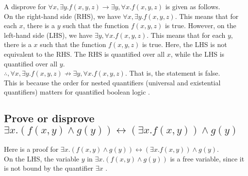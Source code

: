 \documentclass[letter,12pt]{article}
\begin{document}






A disprove for $\forall x, \exists y.f(x, y, z) \rightarrow \exists y, \forall x.f(x, y, z)$ is given as follows. \\

On the right-hand side (RHS), we have $\forall x, \exists y.f(x, y, z)$. This means that for each $x$, there is a $y$ such that the function $f(x, y, z)$ is true. However, on the left-hand side (LHS), we have $\exists y, \forall x.f(x, y, z)$. This means that for each $y$, there is a $x$ such that the function $f(x, y, z)$ is true. Here, the LHS is not equivalent to the RHS. The RHS is quantified over all $x$, while the LHS is quantified over all $y$. \\

$\therefore, \forall x, \exists y.f(x, y, z) \not\rightarrow \exists y, \forall x.f(x, y, z)$. That is, the statement is false. \\

This is because the order for nested quantifiers (universal and existential quantifiers) matters for quantified boolean logic \cite[\S8.2.6, pp. 298]{Russell2010}. \\


\subsection{Prove or disprove $\exists x.(f(x, y) \land g(y)) \leftrightarrow (\exists x.f(x, y)) \land g(y)$}
\label{ssec:q2b}

Here is a proof for $\exists x.(f(x, y) \land g(y)) \leftrightarrow (\exists x.f(x, y)) \land g(y)$. \\

On the LHS, the variable $y$ in $\exists x.(f(x, y) \land g(y))$ is a free variable, since it is not bound by the quantifier $\exists x$ \cite[\S5.2.2, pp. 211, Definition 5-4; pp. 215, Definition 5-10]{Kropf1999} \cite[\S3.4, pp. 104]{Harel2000} \cite[\S7.2.2, pp. 135, Definition 7.12]{BenAri2009}. \\
\end{document}
